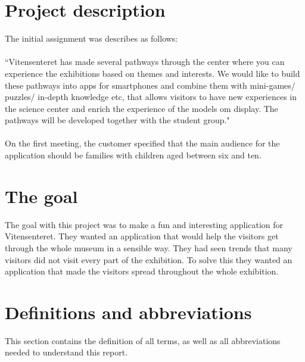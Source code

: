 \section{Project description}
The initial assignment was describes as follows:\\
\\
``Vitensenteret has made several pathways through the center where you can experience the exhibitions based on themes and interests. We would like to build these pathways into apps for smartphones and combine them with mini-games/ puzzles/ in-depth knowledge etc, that allows visitors to have new experiences in the science center and enrich the experience of the models om display. The pathways will be developed together with the student group."\\
\\
On the first meeting, the customer specified that the main audience for the application should be families with children aged between six and ten. 

\section{The goal}
The goal with this project was to make a fun and interesting application for Vitensenteret. They wanted an application that would help the visitors get through the whole museum in a sensible way. They had seen trends that many visitors did not visit every part of the exhibition. To solve this they wanted an application that made the visitors spread throughout the whole exhibition.

\section{Definitions and abbreviations}
This section contains the definition of all terms, as well as all abbreviations needed to understand this report.

